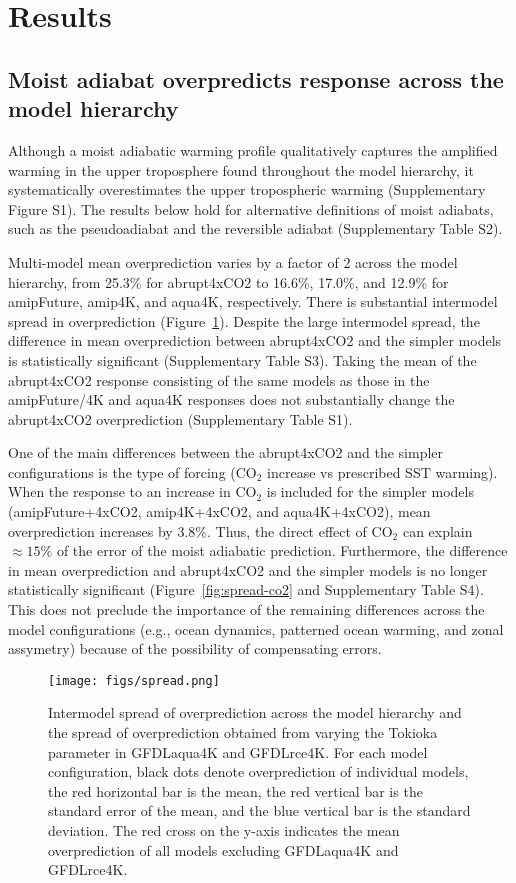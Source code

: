 \documentclass[draft]{agujournal2019}
\begin{document}
\section{Results}
\subsection{Moist adiabat overpredicts response across the model hierarchy}
Although a moist adiabatic warming profile qualitatively captures the amplified warming in the upper troposphere found throughout the model hierarchy, it systematically overestimates the upper tropospheric warming (Supplementary Figure S1). The results below hold for alternative definitions of moist adiabats, such as the pseudoadiabat and the reversible adiabat (Supplementary Table S2).

Multi-model mean overprediction varies by a factor of 2 across the model hierarchy, from 25.3\% for abrupt4xCO2 to 16.6\%, 17.0\%, and 12.9\% for amipFuture, amip4K, and aqua4K, respectively. There is substantial intermodel spread in overprediction (Figure~\ref{fig:spread}). Despite the large intermodel spread, the difference in mean overprediction between abrupt4xCO2 and the simpler models is statistically significant (Supplementary Table S3). Taking the mean of the abrupt4xCO2 response consisting of the same models as those in the amipFuture/4K and aqua4K responses does not substantially change the abrupt4xCO2 overprediction (Supplementary Table S1).

One of the main differences between the abrupt4xCO2 and the simpler configurations is the type of forcing (CO$_2$ increase vs prescribed SST warming). When the response to an increase in CO$_2$ is included for the simpler models (amipFuture+4xCO2, amip4K+4xCO2, and aqua4K+4xCO2), mean overprediction increases by 3.8\%. Thus, the direct effect of CO$_2$ can explain $\approx15\%$ of the error of the moist adiabatic prediction. Furthermore, the difference in mean overprediction and abrupt4xCO2 and the simpler models is no longer statistically significant (Figure~\ref{fig:spread-co2} and Supplementary Table S4). This does not preclude the importance of the remaining differences across the model configurations (e.g., ocean dynamics, patterned ocean warming, and zonal assymetry) because of the possibility of compensating errors. 

\begin{figure}
\centering
\texttt{[image: figs/spread.png]}
\caption{Intermodel spread of overprediction across the model hierarchy and the spread of overprediction obtained from varying the Tokioka parameter in GFDLaqua4K and GFDLrce4K. For each model configuration, black dots denote overprediction of individual models, the red horizontal bar is the mean, the red vertical bar is the standard error of the mean, and the blue vertical bar is the standard deviation. The red cross on the y-axis indicates the mean overprediction of all models excluding GFDLaqua4K and GFDLrce4K.}
\label{fig:spread}
\end{figure}
\end{document}
